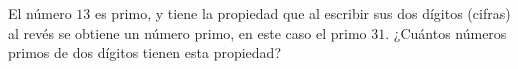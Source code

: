 El número $13$ es primo, y tiene la propiedad que al escribir sus dos dígitos (cifras) al revés se obtiene un número primo, en este caso el primo $31$. ¿Cuántos números primos de dos dígitos tienen esta propiedad?